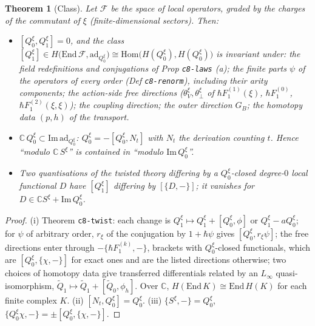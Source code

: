 \documentclass[11pt]{article}
\newtheorem{theorem}{Theorem}
\theoremstyle{definition}
\newcommand{\Qx}{Q^{\xi}}
\newcommand{\ad}{\mathrm{ad}}
\begin{document}
\begin{theorem}[Class]\label{thm:class}
Let $\mathcal F$ be the space of local operators, graded by the charges of the commutant of $\xi$ (finite-dimensional sectors). Then:
\begin{itemize}
\item[(i)] $[\Qx_0,\Qx_1]=0$, and the class $[\Qx_1]\in H\big(\mathrm{End}\,\mathcal F,\ad_{\Qx_0}\big)\cong\mathrm{Hom}\big(H(\Qx_0),H(\Qx_0)\big)$ is invariant under: the field redefinitions and conjugations of Prop \texttt{c8-laws} (a); the finite parts $\psi$ of the operators of every order (Def \texttt{c8-renorm}), including their arity components; the action-side free directions ($\theta^\xi_V,\theta^\xi_\perp$ of $\hbar F^{(1)}_1(\xi)$, $\hbar F^{(0)}_1$, $\hbar F^{(2)}_1(\xi,\xi)$); the coupling direction; the outer direction $G_B$; the homotopy data $(p,h)$ of the transport.
\item[(ii)] $\mathbb C\,\Qx_0\subset\mathrm{Im}\,\ad_{\Qx_0}$: $\Qx_0=-[\Qx_0,N_t]$ with $N_t$ the derivation counting $t$. Hence ``modulo $\mathbb C\,S^\xi$'' is contained in ``modulo $\mathrm{Im}\,\Qx_0$''.
\item[(iii)] Two quantisations of the twisted theory differing by a $\Qx_0$-closed degree-$0$ local functional $D$ have $[\Qx_1]$ differing by $[\{D,-\}]$; it vanishes for $D\in\mathbb C S^\xi+\mathrm{Im}\,\Qx_0$.
\end{itemize}
\end{theorem}
\begin{proof}
(i) Theorem \texttt{c8-twist}: each change is $\Qx_1\mapsto\Qx_1+[\Qx_0,\phi]$ or $\Qx_1-a\Qx_0$; for $\psi$ of arbitrary order, $r_\xi$ of the conjugation by $1+\hbar\psi$ gives $[\Qx_0,r_\xi\psi]$; the free directions enter through $-\{\hbar F^{(k)}_1,-\}$, brackets with $\Qx_0$-closed functionals, which are $[\Qx_0,\{\chi,-\}]$ for exact ones and are the listed directions otherwise; two choices of homotopy data give transferred differentials related by an $L_\infty$ quasi-isomorphism, $\tilde Q_1\mapsto\tilde Q_1+[\tilde Q_0,\phi_h]$. Over $\mathbb C$, $H(\mathrm{End}\,K)\cong\mathrm{End}\,H(K)$ for each finite complex $K$. (ii) $[N_t,\Qx_0]=\Qx_0$. (iii) $\{S^\xi,-\}=\Qx_0$, $\{\Qx_0\chi,-\}=\pm[\Qx_0,\{\chi,-\}]$.
\end{proof}
\end{document}
